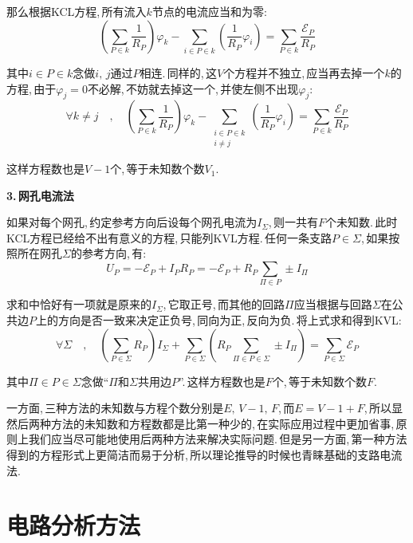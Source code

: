 那么根据KCL方程,\,所有流入$k$节点的电流应当和为零:
\[\left(\sum_{P\in k}\frac{1}{R_P}\right)\varphi_k-\sum_{i\in P\in k}\left(\frac{1}{R_P}\varphi_i\right)=\sum_{P\in k}\frac{\mathscr{E}_P}{R_P}\]

其中$i\in P\in k$念做$i,\,j通过P相连$.\,同样的,\,这$V$个方程并不独立,\,应当再去掉一个$k$的方程,\,由于$\varphi_j=0$不必解,\,不妨就去掉这一个,\,并使左侧不出现$\varphi_j$:
\[\forall k\neq j\quad ,\quad \left(\sum_{P\in k}\frac{1}{R_P}\right)\varphi_k-\sum_{\substack{i\in P\in k\\ i\neq j}}\left(\frac{1}{R_P}\varphi_i\right)=\sum_{P\in k}\frac{\mathscr{E}_P}{R_P}\]

这样方程数也是$V-1$个,\,等于未知数个数$V_1$.

\vspace{0.2cm}
\textbf{3.\,网孔电流法}
\vspace{0.2cm}

如果对每个网孔,\,约定参考方向后设每个网孔电流为$I_\Sigma$,\,则一共有$F$个未知数.\,此时KCL方程已经给不出有意义的方程,\,只能列KVL方程.\,任何一条支路$P\in \Sigma$,\,如果按照所在网孔$\Sigma$的参考方向,\,有:
\[U_P=-\mathscr{E}_P+I_PR_P=-\mathscr{E}_P+R_P\sum_{\Pi \in P}\pm I_\Pi\]

求和中恰好有一项就是原来的$I_\Sigma$,\,它取正号,\,而其他的回路$\Pi$应当根据与回路$\Sigma$在公共边$P$上的方向是否一致来决定正负号,\,同向为正,\,反向为负.\,将上式求和得到KVL:
\[\forall \Sigma\quad ,\quad \left(\sum_{P\in\Sigma}R_P\right)I_\Sigma+\sum_{P\in\Sigma}\left(R_P\sum_{\Pi \in P\in \Sigma}\pm I_\Pi\right)=\sum_{P\in\Sigma}\mathscr{E}_P \]

其中$\Pi \in P\in \Sigma$念做``$\Pi$和$\Sigma$共用边$P$''.\,这样方程数也是$F$个,\,等于未知数个数$F$.

\vspace{0.5cm}

一方面,\,三种方法的未知数与方程个数分别是$E,\,V-1,\,F$,\,而$E=V-1+F$,\,所以显然后两种方法的未知数和方程数都是比第一种少的,\,在实际应用过程中更加省事,\,原则上我们应当尽可能地使用后两种方法来解决实际问题.\,但是另一方面,\,第一种方法得到的方程形式上更简洁而易于分析,\,所以理论推导的时候也青睐基础的支路电流法.

\section{电路分析方法}

